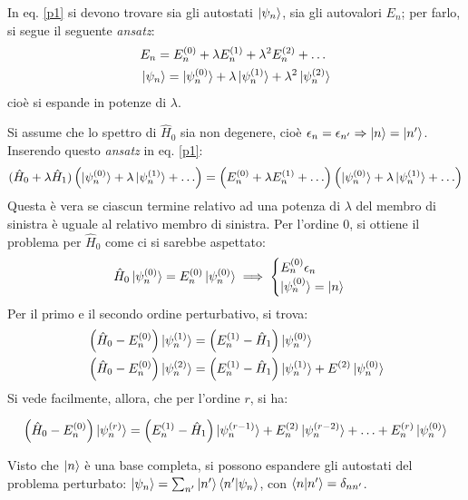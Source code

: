 \documentclass[11pt, a4paper]{scrartcl} %
\numberwithin{equation}{subsection}
\theoremstyle{style2}
\theoremstyle{style1}
\newenvironment{boxenv}[1][]{
    \begin{eqbox}[#1]
    }{
   \end{eqbox}
}
\begin{document}
In eq. \ref{p1} si devono trovare sia gli autostati $\ket{\psi _n} $, sia gli autovalori $E_n$; per farlo, si segue il seguente \textit{ansatz}: 
\begin{equation}
	\begin{split}
		&E_n = E_n^{(0)} + \lambda E_n^{(1)} + \lambda ^2 E_n^{(2)} + \ldots\\
		& \ket{\psi _n} = \ket{\psi _n^{(0)} }  + \lambda \ket{\psi ^{(1)} _n} + \lambda ^2 \ket{\psi ^{(2)} _n} 
	\end{split}
\end{equation}
cio\`e si espande in potenze di $\lambda $.

Si assume che lo spettro di $\hat{H}_0$ sia non degenere, cio\`e $\epsilon _n = \epsilon _{n'} \Rightarrow  \ket{n}  = \ket{n'} $.
Inserendo questo \textit{ansatz} in eq. \ref{p1}:
\[
	(\hat{H}_0+\lambda \hat{H}_1) \left(\ket{\psi ^{(0)} _n} + \lambda \ket{\psi ^{(1)} _n} + \ldots \right) = \left(E_n^{(0)} + \lambda E^{(1)} _n + \ldots\right) \left(\ket{\psi _n^{(0)} } + \lambda \ket{\psi ^{(1)} _n} +\ldots \right) 
\] 
Questa \`e vera se ciascun termine relativo ad una potenza di $\lambda $ del membro di sinistra \`e uguale al relativo membro di sinistra. 
Per l'ordine $0$, si ottiene il problema per $\hat{H}_0$ come ci si sarebbe aspettato:
\[
\hat{H}_0\ket{\psi ^{(0)} _n} = E_n^{(0)} \ket{\psi _n^{(0)} } \implies \begin{cases}
	E_n^{(0)} \epsilon _n\\
	\ket{\psi _n^{(0)} } = \ket{n} 
\end{cases}
\] 
Per il primo e il secondo ordine perturbativo, si trova:
\[
	\begin{split}
		&\left(\hat{H}_0 - E_n^{(0)} \right) \ket{\psi ^{(1)} _n} = \left(E^{(1)} _n - \hat{H}_1\right) \ket{\psi ^{(0)} _n} \\
		&\left(\hat{H}_0- E^{(0)} _n\right) \ket{\psi ^{(2)} _n} = \left(E^{(1)}_n -\hat{H}_1\right) \ket{\psi ^{(1)}_n } + E^{(2)} \ket{\psi ^{(0)} _n} 
	\end{split}
\] 
Si vede facilmente, allora, che per l'ordine $r$, si ha:
\begin{boxenv}[]
\begin{equation}
	 \left(\hat{H}_0 - E^{(0)} _n\right) \ket{\psi ^{(r)} _n} = \left(E^{(1)} _n - \hat{H}_1\right) \ket{\psi ^{(r-1)} _n} + E^{(2)} _n\ket{\psi ^{(r-2)} _n} + \ldots + E^{(r)} _n \ket{\psi _n^{(0)} } 
\end{equation}
\end{boxenv}
Visto che $\ket{n} $ \`e una base completa, si possono espandere gli autostati del problema perturbato: $\ket{\psi _n} = \sum_{n'}^{} \ket{n'} \braket{n'|\psi _n} $, con $\braket{n|n'} = \delta _{nn'} $.
\end{document}
